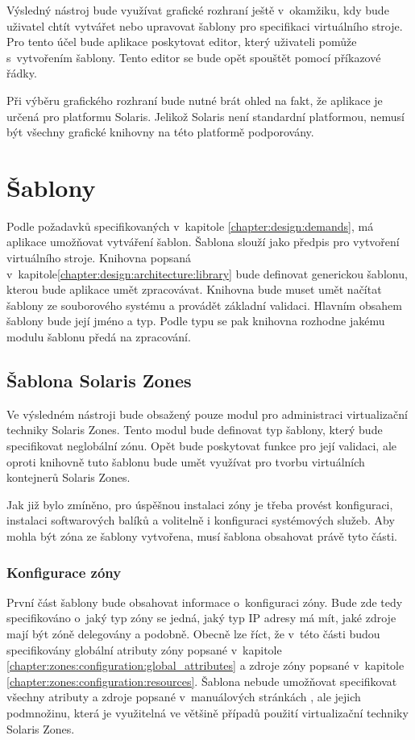 Výsledný nástroj bude využívat grafické rozhraní ještě v~okamžiku, kdy bude uživatel chtít vytvářet nebo upravovat šablony pro
specifikaci virtuálního stroje. Pro tento účel bude aplikace poskytovat editor, který uživateli pomůže s~vytvořením šablony.
Tento editor se bude opět spouštět pomocí příkazové řádky.

Při výběru grafického rozhraní bude nutné brát ohled na fakt, že aplikace je určená pro platformu Solaris. Jelikož Solaris
není standardní platformou, nemusí být všechny grafické knihovny na této platformě podporovány.
\section{Šablony}
\label{chapter:design:templates}
Podle požadavků specifikovaných v~kapitole \ref{chapter:design:demands}, má aplikace umožňovat vytváření šablon. Šablona slouží
jako předpis pro vytvoření virtuálního stroje. Knihovna popsaná v~kapitole\ref{chapter:design:architecture:library} bude definovat 
generickou šablonu, kterou bude aplikace umět zpracovávat. Knihovna bude muset umět načítat šablony ze souborového systému
a provádět základní validaci. Hlavním obsahem šablony bude její jméno a typ. Podle typu se pak knihovna rozhodne
jakému modulu šablonu předá na zpracování.
\subsection{Šablona Solaris Zones}
\label{chapter:design:templates:zones}
Ve výsledném nástroji bude obsažený pouze modul pro administraci virtualizační techniky Solaris Zones. Tento modul bude
definovat typ šablony, který bude specifikovat neglobální zónu. Opět bude poskytovat funkce pro její validaci, ale oproti
knihovně tuto šablonu bude umět využívat pro tvorbu virtuálních kontejnerů Solaris Zones.

Jak již bylo zmíněno, pro úspěšnou instalaci zóny je třeba provést konfiguraci, instalaci 
softwarových balíků a volitelně i konfiguraci systémových služeb. Aby mohla být zóna ze šablony vytvořena, musí šablona obsahovat
právě tyto části.
\subsubsection{Konfigurace zóny}
\label{chapter:design:templates:zones:configuration}
První část šablony bude obsahovat informace o~konfiguraci zóny. Bude zde tedy specifikováno o~jaký typ zóny se jedná,
jaký typ IP adresy má mít, jaké zdroje mají být zóně delegovány a podobně. Obecně lze říct, že v~této části budou specifikovány
globální atributy zóny popsané v~kapitole \ref{chapter:zones:configuration:global_attributes} a zdroje zóny popsané v~kapitole
\ref{chapter:zones:configuration:resources}. Šablona nebude umožňovat specifikovat všechny atributy a zdroje popsané
v~manuálových stránkách \cite{oracle:manpages:zonecfg}, ale jejich podmnožinu, která je využitelná ve většině případů použití virtualizační
techniky Solaris Zones.
